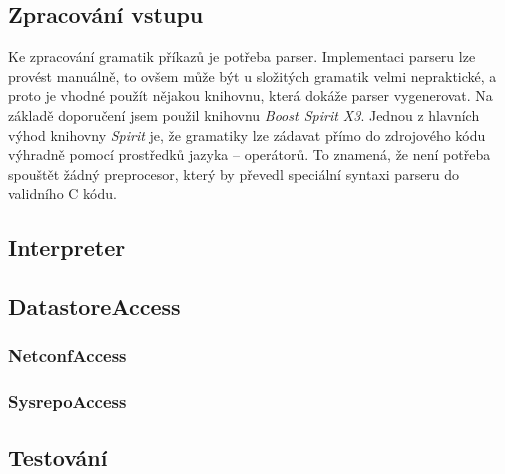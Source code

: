 \documentclass[thesis=B,czech]{FITthesis}[2019/03/06]
\newcommand{\Rplus}{\protect\hspace{-.1em}\protect\raisebox{.35ex}{\smaller{\smaller\textbf{+}}}}
\newcommand{\Cpp}{\mbox{C\Rplus\Rplus}\xspace}
\begin{document}

\subsection{Zpracování vstupu}

Ke zpracování gramatik příkazů je potřeba parser. Implementaci parseru lze provést manuálně, to ovšem může být u složitých gramatik velmi nepraktické, a proto je vhodné použít nějakou knihovnu, která dokáže parser vygenerovat. Na základě doporučení  jsem použil knihovnu \textit{Boost Spirit X3}. Jednou z hlavních výhod knihovny \textit{Spirit} je, že gramatiky lze zádavat přímo do zdrojového kódu výhradně pomocí prostředků jazyka -- operátorů. To znamená, že není potřeba spouštět žádný preprocesor, který by převedl speciální syntaxi parseru do validního \Cpp{} kódu.



\subsection{Interpreter}

\subsection{DatastoreAccess}

\subsubsection{NetconfAccess}

\subsubsection{SysrepoAccess}

\subsection{Testování}
\end{document}
